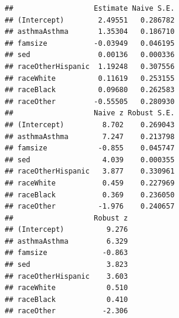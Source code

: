 \documentclass[]{tufte-book}
\newenvironment{Shaded}{}{}
\newcommand{\KeywordTok}[1]{\textcolor[rgb]{0.00,0.44,0.13}{\textbf{#1}}}
\newcommand{\DataTypeTok}[1]{\textcolor[rgb]{0.56,0.13,0.00}{#1}}
\newcommand{\StringTok}[1]{\textcolor[rgb]{0.25,0.44,0.63}{#1}}
\newcommand{\OperatorTok}[1]{\textcolor[rgb]{0.40,0.40,0.40}{#1}}
\newcommand{\NormalTok}[1]{#1}
\theoremstyle{definition}
\theoremstyle{definition}
\theoremstyle{remark}
\begin{document}
\begin{verbatim}
##                   Estimate Naive S.E.
## (Intercept)        2.49551   0.286782
## asthmaAsthma       1.35304   0.186710
## famsize           -0.03949   0.046195
## sed                0.00136   0.000336
## raceOtherHispanic  1.19248   0.307556
## raceWhite          0.11619   0.253155
## raceBlack          0.09680   0.262583
## raceOther         -0.55505   0.280930
##                   Naive z Robust S.E.
## (Intercept)         8.702    0.269043
## asthmaAsthma        7.247    0.213798
## famsize            -0.855    0.045747
## sed                 4.039    0.000355
## raceOtherHispanic   3.877    0.330961
## raceWhite           0.459    0.227969
## raceBlack           0.369    0.236050
## raceOther          -1.976    0.240657
##                   Robust z
## (Intercept)          9.276
## asthmaAsthma         6.329
## famsize             -0.863
## sed                  3.823
## raceOtherHispanic    3.603
## raceWhite            0.510
## raceBlack            0.410
## raceOther           -2.306
\end{verbatim}

\begin{Shaded}
\end{Shaded}
\end{document}
